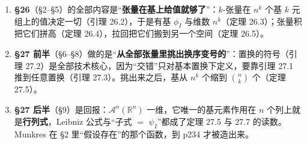 \documentclass[11pt]{ctexart}
\newcommand{\Ak}{\mathcal{A}}
\begin{document}
\begin{enumerate}
  \item \textbf{§26}（§2--§5）的全部内容是“\textbf{张量在基上给值就够了}”：$k$-张量在 $n^k$ 个基 $k$ 元组上的值决定一切（引理 26.2），于是有基 $\phi_I$ 与维数 $n^k$（定理 26.3）；张量积把它们拼高（定理 26.4），拉回把它们搬到另一个空间（定理 26.5）。
  \item \textbf{§27 前半}（§6--§8）做的是“\textbf{从全部张量里挑出换序变号的}”：置换的符号（引理 27.2）是全部技术核心，因为“交错”只对基本置换下定义，要靠引理 27.1 推到任意置换（引理 27.3）。挑出来之后，基从 $n^k$ 个缩到 $\binom nk$ 个（定理 27.5）。
  \item \textbf{§27 后半}（§9）是回报：$\Ak^n(\mathbb R^n)$ 一维，它唯一的基元素作用在 $n$ 个列上就是\textbf{行列式}，Leibniz 公式与“子式 $=$ $\psi_I$”都成了定理 27.5 与 27.7 的读数。Munkres 在 §2 里“假设存在”的那个函数，到 p234 才被造出来。
\end{enumerate}

\end{document}
